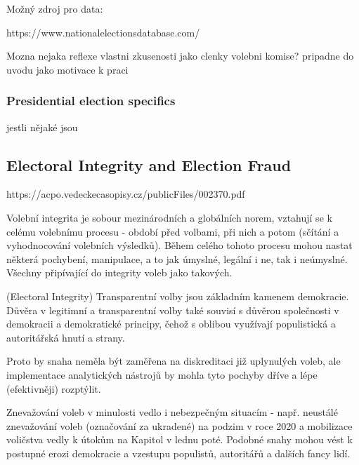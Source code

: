 Možný zdroj pro data: 

https://www.nationalelectionsdatabase.com/ 

\begin{koment}
Mozna nejaka reflexe vlastni zkusenosti jako clenky volebni komise? pripadne do uvodu jako motivace k praci
\end{koment}


\subsubsection*{Presidential election specifics}

jestli nějaké jsou 

\subsection{Electoral Integrity and Election Fraud}

\begin{koment}
    https://acpo.vedeckecasopisy.cz/publicFiles/002370.pdf

Volební integrita je sobour mezinárodních a globálních norem, vztahují se k celému volebnímu procesu - období před volbami, při nich a potom (sčítání a vyhodnocování volebních výsledků). Během celého tohoto procesu mohou nastat některá pochybení, manipulace, a to jak úmyslné, legální i ne, tak i neúmyslné. Všechny připívající do integrity voleb jako takových. \cite{Lebeda2021}

(Electoral Integrity) Transparentní volby jsou základním kamenem demokracie. Důvěra v legitimní a transparentní volby také souvisí s důvěrou společnosti v demokracii a demokratické principy, čehož s oblibou využívají populistická a autoritářská hnutí a strany. \cite{Lebeda2021}

Proto by snaha neměla být zaměřena na diskreditaci již uplynulých voleb, ale implementace analytických nástrojů by mohla tyto pochyby dříve a lépe (efektivněji) rozptýlit. \cite{Lebeda2021}

Znevažování voleb v minulosti vedlo i nebezpečným situacím - např. neustálé znevažování voleb (označování za ukradené) na podzim v roce 2020 a mobilizace voličstva vedly k útokům na Kapitol v lednu poté. Podobné snahy mohou vést k postupné erozi demokracie a vzestupu populistů, autoritářů a dalších fancy lidí. \cite{Lebeda2021}

\end{koment}

